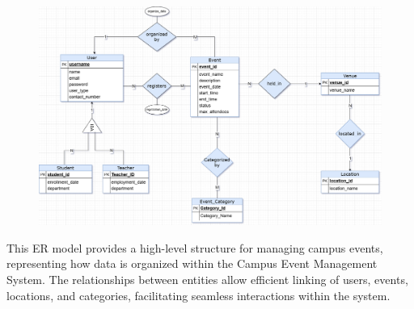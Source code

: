 \begin{figure}[h]
    \centering
    \vspace{-1cm}
    \hspace*{-3cm} %
    \includegraphics[scale=.4]{images/meetup2.0.drawio.png}
\end{figure}


This ER model provides a high-level structure for managing campus events, representing how data is organized within the Campus Event Management System. The relationships between entities allow efficient linking of users, events, locations, and categories, facilitating seamless interactions within the system.
\clearpage